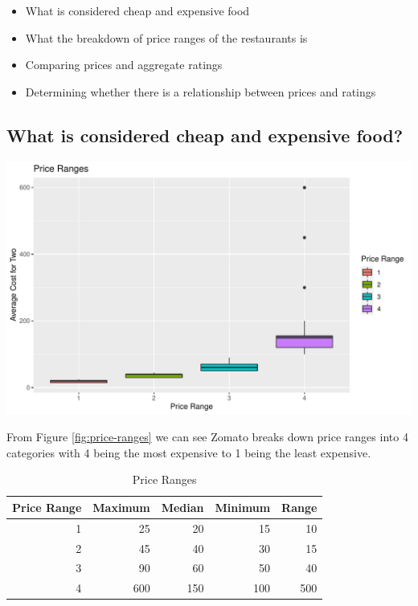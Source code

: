 \documentclass[11pt,a4paper,]{article}
\providecommand{\tightlist}{%
  \setlength{\itemsep}{0pt}\setlength{\parskip}{0pt}}
\let\origfigure\figure
\let\endorigfigure\endfigure
\renewenvironment{figure}[1][2] {
    \expandafter\origfigure\expandafter[H]
} {
    \endorigfigure
}%
\begin{document}
\begin{itemize}
\tightlist
\item
  What is considered cheap and expensive food
\item
  What the breakdown of price ranges of the restaurants is
\item
  Comparing prices and aggregate ratings
\item
  Determining whether there is a relationship between prices and ratings
\end{itemize}

\hypertarget{what-is-considered-cheap-and-expensive-food}{%
\subsection{What is considered cheap and expensive food?}\label{what-is-considered-cheap-and-expensive-food}}

\begin{figure}
\centering
\includegraphics{assignment4_files/figure-latex/price-ranges-1.pdf}
\caption{\label{fig:price-ranges}Price Ranges}
\end{figure}

From Figure \ref{fig:price-ranges} we can see Zomato breaks down price ranges into 4 categories with 4 being the most expensive to 1 being the least expensive.

\begin{table}[!h]

\caption{\label{tab:price-range-table}Price Ranges}
\centering
\begin{tabular}[t]{r|r|r|r|r}
\hline
Price Range & Maximum & Median & Minimum & Range\\
\hline
1 & 25 & 20 & 15 & 10\\
\hline
2 & 45 & 40 & 30 & 15\\
\hline
3 & 90 & 60 & 50 & 40\\
\hline
4 & 600 & 150 & 100 & 500\\
\hline
\end{tabular}
\end{table}
\end{document}
